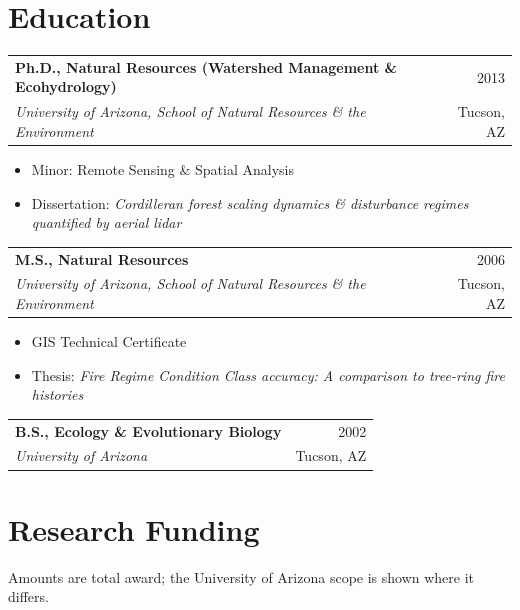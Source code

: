 \documentclass[11pt,letterpaper]{article}
\makeatletter
\newcommand{\role}[4]{%
  \begin{tabularx}{\linewidth}{@{}X r@{}}
    \textbf{#1} & {\small #2}\\
    \textit{#3} & {\small\color{muted}#4}
  \end{tabularx}\par\vspace{4pt}}
\newcommand{\note}[1]{{\small\color{muted}#1}}
\makeatother
\begin{document}
\section{Education}
\role{Ph.D., Natural Resources (Watershed Management \& Ecohydrology)}{2013}{University of Arizona, School of Natural Resources \& the Environment}{Tucson, AZ}
\vspace{-3pt}
\begin{itemize}
  \item Minor: Remote Sensing \& Spatial Analysis
  \item Dissertation: \emph{Cordilleran forest scaling dynamics \& disturbance regimes quantified by aerial lidar}
\end{itemize}\vspace{4pt}
\role{M.S., Natural Resources}{2006}{University of Arizona, School of Natural Resources \& the Environment}{Tucson, AZ}
\vspace{-3pt}
\begin{itemize}
  \item GIS Technical Certificate
  \item Thesis: \emph{Fire Regime Condition Class accuracy: A comparison to tree-ring fire histories}
\end{itemize}\vspace{4pt}
\role{B.S., Ecology \& Evolutionary Biology}{2002}{University of Arizona}{Tucson, AZ}

\section{Research Funding}
\note{Amounts are total award; the University of Arizona scope is shown where it differs.}
\end{document}
